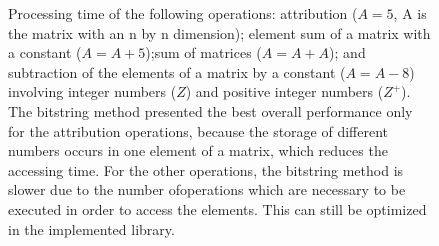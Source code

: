 \documentclass[10pt]{article}
\begin{document}
\begin{figure}[h]
{  }
  \caption{Processing time of the following operations: attribution ($A=5$, A is 
the matrix with an n by n dimension); 
  element sum of a matrix with a constant ($A=A+5$);sum of matrices ($A=A+A$); 
and subtraction of the elements of a 
  matrix by a constant ($A=A-8$) involving integer numbers ($Z$) and positive 
integer numbers ($Z^+$). The bitstring 
  method presented the best overall performance only for the attribution 
operations, because the storage of 
  different numbers occurs in one element of a matrix, which reduces the 
accessing time. For the other operations, 
  the bitstring method is slower due to the number ofoperations which are 
necessary to be  executed in order to 
  access the elements. This can still be optimized in the implemented library.}
  \label{fig:23242526}
\end{figure}
\end{document}
